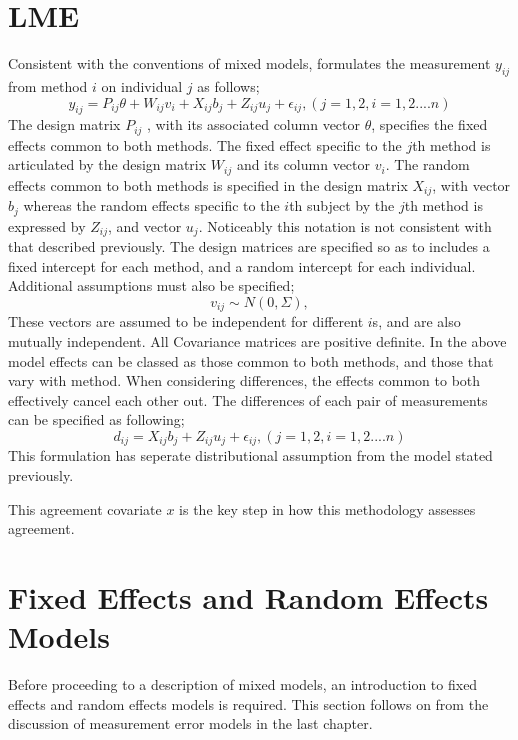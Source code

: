 \documentclass[12pt, a4paper]{report}
\theoremstyle{plain}
\theoremstyle{definition}
\theoremstyle{remark}
\begin{document}
\section{LME}
Consistent with the conventions of mixed models, \citet{pkc}
formulates the measurement $y_{ij} $from method $i$ on individual
$j$ as follows;
\begin{equation}
y_{ij} =P_{ij}\theta + W_{ij}v_{i} + X_{ij}b_{j} + Z_{ij}u_{j} +
\epsilon_{ij},     (j=1,2, i=1,2....n)
\end{equation}
The design matrix $P_{ij}$ , with its associated column vector
$\theta$, specifies the fixed effects common to both methods. The
fixed effect specific to the $j$th method is articulated by the
design matrix $W_{ij}$ and its column vector $v_{i}$. The random
effects common to both methods is specified in the design matrix
$X_{ij}$, with vector $b_{j}$ whereas the random effects specific
to the $i$th subject by the $j$th method is expressed by $Z_{ij}$,
and vector $u_{j}$. Noticeably this notation is not consistent
with that described previously.  The design matrices are specified
so as to includes a fixed intercept for each method, and a random
intercept for each individual. Additional assumptions must also be
specified;
\begin{equation}
v_{ij} \sim N(0,\Sigma),
\end{equation}
These vectors are assumed to be independent for different $i$s,
and are also mutually independent. All Covariance matrices are
positive definite.  In the above model effects can be classed as
those common to both methods, and those that vary with method.
When considering differences, the effects common to both
effectively cancel each other out. The differences of each pair of
measurements can be specified as following;
\begin{equation}
d_{ij} = X_{ij}b_{j} + Z_{ij}u_{j} + \epsilon_{ij},     (j=1,2,
i=1,2....n)
\end{equation}
This formulation has seperate distributional assumption from the
model stated previously.

This agreement covariate $x$ is the key step in how this
methodology assesses agreement.


\section{Fixed Effects and Random Effects Models}
Before proceeding to a description of mixed models, an
introduction to fixed effects and random effects models is
required. This section follows on from the discussion of
measurement error models in the last chapter.
\end{document}
